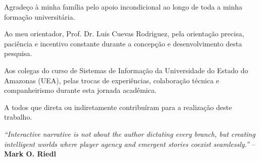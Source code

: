 \documentclass[12pt,a4paper,oneside]{report}
\begin{document}
Agradeço à minha família pelo apoio incondicional ao longo de toda a minha formação universitária.

Ao meu orientador, Prof. Dr. Luis Cuevas Rodriguez, pela orientação precisa, paciência e incentivo constante durante a concepção e desenvolvimento desta pesquisa.

Aos colegas do curso de Sistemas de Informação da Universidade do Estado do Amazonas (UEA), pelas trocas de experiências, colaboração técnica e companheirismo durante esta jornada acadêmica.

A todos que direta ou indiretamente contribuíram para a realização deste trabalho.

\vspace{3.5cm}
\hfill
\begin{minipage}{0.65\textwidth}
\linespread{1.1}\selectfont
\small
\textit{``Interactive narrative is not about the author dictating every branch, but creating intelligent worlds where player agency and emergent stories coexist seamlessly.''}
\vspace{0.2cm}
\hfill -- \textbf{Mark O. Riedl}
\end{minipage}

\newpage
\end{document}
